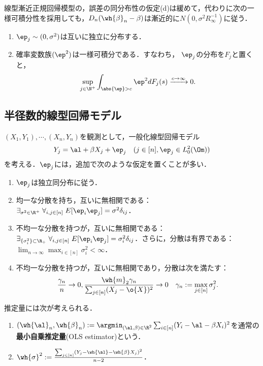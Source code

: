 \documentclass[uplatex,dvipdfmx]{jsreport}
\begin{document}
\begin{corollary}
    線型漸近正規回帰模型の，誤差の同分布性の仮定(d)は緩めて，代わりに次の一様可積分性を採用しても，$D_n(\wh{\beta}_n-\beta)$は漸近的に$N(0,\sigma^2R_\infty^{-1})$に従う．
    \begin{enumerate}
        \item $\ep_j\sim (0,\sigma^2)$は互いに独立に分布する．
        \item 確率変数族$(\ep^2)$は一様可積分である．すなわち，
        $\ep_j$の分布を$F_j$と置くと，
        \[\sup_{j\in\N^+}\int_{\abs{\ep}>c}\ep^2dF_j(s)\xrightarrow{c\to\infty}0.\]
    \end{enumerate}
\end{corollary}

\subsection{半径数的線型回帰モデル}

\begin{model}
    $(X_1,Y_1),\cdots,(X_n,Y_n)$を観測として，一般化線型回帰モデル
    \[Y_j=\al+\beta X_j+\ep_j\quad(j\in[n],\ep_j\in L^2_0(\Om))\]
    を考える．$\ep_j$には，追加で次のような仮定を置くことが多い．
    \begin{enumerate}[({A}1)]
        \item $\ep_j$は独立同分布に従う．
        \item 均一な分散を持ち，互いに無相関である：$\exists_{\sigma^2\in\R^+}\;\forall_{i,j\in[n]}\;E[\ep_i\ep_j]=\sigma^2\delta_{ij}$．
        \item 不均一な分散を持つが，互いに無相関である：$\exists_{\{\sigma^2_i\}\subset\R_+}\;\forall_{i,j\in[n]}\;E[\ep_i\ep_j]=\sigma_i^2\delta_{ij}$．さらに，分散は有界である：$\lim_{n\to\infty}\max_{i\in[n]}\sigma^2_i<\infty$．
        \item 不均一な分散を持つが，互いに無相関であり，分散は次を満たす：
        \[\frac{\gamma_n}{n}\to0,\frac{\wh{m}_2\gamma_n}{\sum_{j\in[n]}(X_j-\o{X})^2}\to0\quad\gamma_n:=\max_{j\in[n]}\sigma_j^2.\]
    \end{enumerate}
    推定量には次が考えられる．
    \begin{enumerate}
        \item $(\wh{\al}_n,\wh{\beta}_n):=\argmin_{(\al,\beta)\in\R^2}\sum_{i\in[n]}(Y_i-\al-\beta X_i)^2$を通常の\textbf{最小自乗推定量}(OLS estimator)という．
        \item $\wh{\sigma}^2:=\frac{\sum_{j\in[n]}(Y_j-\wh{\al}-\wh{\beta}X_j)^2}{n-2}$．
    \end{enumerate}
\end{model}
\end{document}
